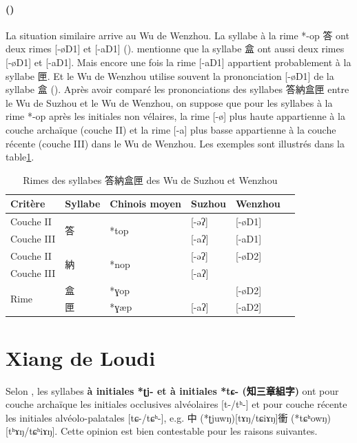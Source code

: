 \documentclass{scrbook}
\newcounter{c}[subsubsection]
\newcommand{\stpc}[1]{\stepcounter{#1}}
\newcommand{\illustre}{Les exemples sont illustrés dans la table\xspace}
\newcommand{\termyyx}[1]{\textbf{#1}}
\begin{document}
\begin{sloppypar}
\stpc{c}\paragraph{()}
La situation similaire arrive au Wu de Wenzhou. La syllabe à la rime *-op 答 ont deux rimes [-øD1] et [-aD1] (\cite{Pan1998wenzhou}). \textcite[21]{Wu2005wenzhou} mentionne que la syllabe 盒 ont aussi deux rimes [-øD1] et [-aD1]. Mais encore une fois la rime [-aD1] appartient probablement à la syllabe 匣. Et le Wu de Wenzhou utilise souvent la prononciation [-øD1] de la syllabe 盒 (\cite[189]{You1998Wenzhou}). Après avoir comparé les prononciations des syllabes 答納盒匣 entre le Wu de Suzhou et le Wu de Wenzhou, on suppose que pour les syllabes à la rime *-op après les initiales non vélaires, la rime [-ø] plus haute appartienne à la couche archaïque (couche II) et la rime [-a] plus basse appartienne à la couche récente (couche III) dans le Wu de Wenzhou. \illustre \ref{tab:couche_op_suzhou_wenzhou}.

\begin{table}[htbp]
  \centering
    \begin{tabular}{lllllr}
    \toprule
    Critère & Syllabe & Chinois moyen  & Suzhou & Wenzhou \\
    \midrule
    Couche II & \multirow{2}[2]{*}{答} & \multirow{2}[2]{*}{*top} & [-əʔ] & [-øD1] \\
    Couche III &       &       & [-aʔ] & [-aD1] \\
    \midrule
    Couche II & \multirow{2}[2]{*}{納} & \multirow{2}[2]{*}{*nop} & [-əʔ] & [-øD2] \\
    Couche III &       &       & [-aʔ] &  \\
    \midrule
    \multirow{2}[2]{*}{Rime} & 盒     & *ɣop  &       & [-øD2] \\
          & 匣     & *ɣæp  & [-aʔ] & [-aD2] \\
    \bottomrule
    \end{tabular}%
  \caption{Rimes des syllabes 答納盒匣 des Wu de Suzhou et Wenzhou}
  \label{tab:couche_op_suzhou_wenzhou}%
\end{table}%

\section{Xiang de Loudi}\label{variant_libre_loudi}
Selon \textcite[31--33]{Zhou2005xiang}, les syllabes \termyyx{à initiales *ʈj- et à initiales *tɕ- (知三章組字)} ont pour couche archaïque les initiales occlusives alvéolaires [t-/tʰ-] et pour couche récente les initiales alvéolo-palatales [tɕ-/tɕʰ-], e.g. 中 (*ʈjuwŋ)[tɤŋ/tɕiɤŋ]衝 (*tɕʰowŋ)[tʰɤŋ/tɕʰiɤŋ]. Cette opinion est bien contestable pour les raisons suivantes.


\end{sloppypar}
\end{document}
